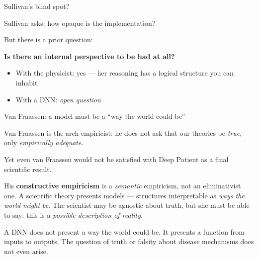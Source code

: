\documentclass[fleql]{beamer}
\newcommand{\kw}[1]{\textbf{#1}}
\begin{document}
\begin{frame}{Sullivan's blind spot?}

  Sullivan asks: how opaque is the implementation?

  \vspace{0.6em}
  But there is a prior question:

  \begin{center}
  \kw{Is there an internal perspective to be had at all?}
  \end{center}

  \vspace{0.5em}
  \begin{itemize}
  \item With the physicist: yes --- her reasoning has a logical
    structure you can inhabit
  \item With a DNN: \emph{open question}
  \end{itemize}

\end{frame}

\begin{frame}{Van Fraassen: a model must be a ``way the world could be''}

  Van Fraassen is the arch empiricist: he does not ask that our
  theories be \emph{true}, only \emph{empirically adequate}.

  \vspace{0.5em}
  Yet even van Fraassen would not be satisfied with Deep Patient
  as a final scientific result.

  \vspace{0.5em}
  His \kw{constructive empiricism} is a \emph{semantic} empiricism,
  not an eliminativist one. A scientific theory presents models ---
  structures interpretable as \emph{ways the world might be}.
  The scientist may be agnostic about truth, but she must be able
  to say: this is a \emph{possible description of reality}.

  \vspace{0.5em}
  A DNN does not present a way the world could be. It presents a
  function from inputs to outputs. The question of truth or
  falsity about disease mechanisms does not even arise.

\end{frame}
\end{document}
